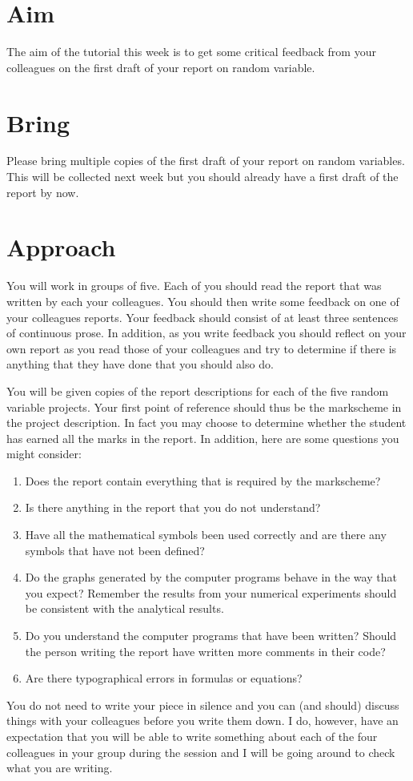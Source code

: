 \documentclass[a4paper]{article}
\begin{document}
\section{Aim}

The aim of the tutorial this week is to get some critical feedback from your colleagues on the first draft of your report on random variable.

\section{Bring}

Please bring multiple copies of the first draft of your report on random variables.  This will be collected next week but you should already have a first draft of the report by now.

\section{Approach}

You will work in groups of five.  Each of you should read the report that was written by each your colleagues. You should then write some feedback on one of your colleagues reports.  Your feedback 
should consist of at least three sentences of continuous prose.  In addition, as you write feedback you should reflect on your own report as you read those of your colleagues and try to determine if 
there is anything that they have done that you should also do.  

You will be given copies of the report descriptions for each of the five random variable projects.  Your first point of reference should thus be the markscheme in the project description.  In fact 
you may choose to determine whether the student has earned all the marks in the report.  In addition, here are some questions you might consider:

\begin{enumerate}
 \item Does the report contain everything that is required by the markscheme?
 \item Is there anything in the report that you do not understand?
 \item Have all the mathematical symbols been used correctly and are there any symbols that have not been defined?
 \item Do the graphs generated by the computer programs behave in the way that you expect?  Remember the results from your numerical experiments should be consistent with the analytical results.
 \item Do you understand the computer programs that have been written?  Should the person writing the report have written more comments in their code?
 \item Are there typographical errors in formulas or equations?
\end{enumerate}

You do not need to write your piece in silence and you can (and should) discuss things with your colleagues before you write them down.  I do, however, have an expectation that you will be able to 
write something about each of the four colleagues in your group during the session and I will be going around to check what you are writing.
\end{document}

